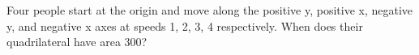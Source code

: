 Four people start at the origin and move along the positive y, positive x, negative y, and negative x axes at speeds 1, 2, 3, 4 respectively. When does their quadrilateral have area 300?
